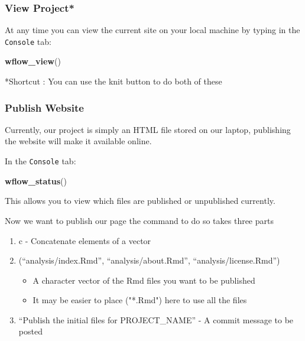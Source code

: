 \documentclass[openany]{book}
\newenvironment{Shaded}{\begin{snugshade}}{\end{snugshade}}
\newcommand{\KeywordTok}[1]{\textcolor[rgb]{0.13,0.29,0.53}{\textbf{#1}}}
\newcommand{\NormalTok}[1]{#1}
\providecommand{\tightlist}{%
  \setlength{\itemsep}{0pt}\setlength{\parskip}{0pt}}
\begin{document}
\hypertarget{view-project}{%
\subsubsection{View Project*}\label{view-project}}

At any time you can view the current site on your local machine by typing in the \texttt{Console} tab:

\begin{Shaded}
\begin{Highlighting}[]
\KeywordTok{wflow_view}\NormalTok{()}
\end{Highlighting}
\end{Shaded}

*Shortcut : You can use the knit button to do both of these

\hypertarget{publish-website}{%
\subsubsection{Publish Website}\label{publish-website}}

Currently, our project is simply an HTML file stored on our laptop, publishing the website will make it available online.

In the \texttt{Console} tab:

\begin{Shaded}
\begin{Highlighting}[]
\KeywordTok{wflow_status}\NormalTok{()}
\end{Highlighting}
\end{Shaded}

This allows you to view which files are published or unpublished currently.

Now we want to publish our page the command to do so takes three parts

\begin{enumerate}
\def\labelenumi{\arabic{enumi}.}
\tightlist
\item
  c - Concatenate elements of a vector
\item
  (``analysis/index.Rmd'', ``analysis/about.Rmd'', ``analysis/license.Rmd'')

  \begin{itemize}
  \tightlist
  \item
    A character vector of the Rmd files you want to be published
  \item
    It may be easier to place ("*.Rmd") here to use all the files
  \end{itemize}
\item
  ``Publish the initial files for PROJECT\_NAME'' - A commit message to be posted
\end{enumerate}
\end{document}
